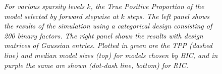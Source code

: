 \documentclass{imsart}
\begin{document}
\begin{figure}
\begin{center}
\hspace{-15pt}
\caption{\small \em
  For various sparsity levels $k$, the True Positive Proportion of the
  model selected by forward stepwise at $k$ steps.
  The left panel shows the results of the simulation
  using a categorical design consisting of 200 binary factors.
  The right panel shows the results with design matrices of Gaussian
  entries. Plotted in green are the TPP (dashed line) and median model
  sizes (top) for models chosen by BIC, and in purple the same are shown
  (dot-dash line, bottom) for RIC.}
\label{fig:fwdstepsim}
\end{center}
\end{figure}
\end{document}
